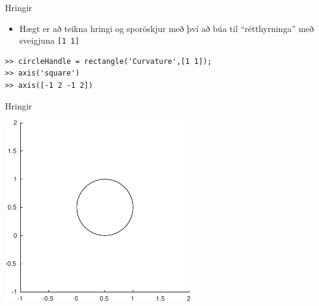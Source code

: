 \documentclass[handout]{beamer}
\begin{document}
\begin{frame}[fragile]{Hringir}
\pause
\begin{itemize}
 \item Hægt er að teikna hringi og sporöskjur með því að búa til ``rétthyrninga'' með sveigjuna \texttt{[1 1]}
\end{itemize}
\begin{verbatim}
>> circleHandle = rectangle('Curvature',[1 1]);
>> axis('square')
>> axis([-1 2 -1 2])
\end{verbatim}
\end{frame}

\begin{frame}{Hringir}
\begin{center}
\includegraphics[width=0.6\textwidth]{Pics/circle-example}
\end{center}
\end{frame}
\end{document}
